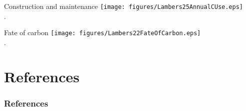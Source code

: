 \documentclass[10pt]{beamer}
\begin{document}
\begin{frame}{Construction and maintenance}
    \centering
    \texttt{[image: figures/Lambers25AnnualCUse.eps]}\\
    {\small \autocite[from][]{LambersEtAl1998}.}
\end{frame}

\begin{frame}{Fate of carbon}
    \centering
    \texttt{[image: figures/Lambers22FateOfCarbon.eps]}\\
    {\small \autocite[from][]{LambersEtAl1998}.}
\end{frame}

  \section*{References}
  \begin{frame}[t,allowframebreaks]
    \frametitle{References}
    \printbibliography
  \end{frame}
\end{document}
